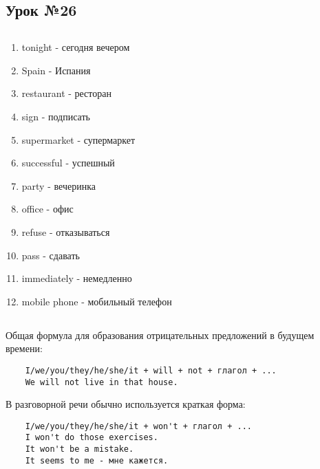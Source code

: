 \subsection{Урок №26}

\subsection*{}
\begin{multicols}{2}
    \begin{enumerate}\setlength{\itemsep}{0pt}
        \item tonight - сегодня вечером
        \item Spain - Испания
        \item restaurant - ресторан
        \item sign - подписать
        \item supermarket - супермаркет
        \item successful - успешный
        \item party - вечеринка
        \item office - офис
        \item refuse - отказываться
        \item pass - сдавать
        \item immediately - немедленно
        \item mobile phone - мобильный телефон
    \end{enumerate}
\end{multicols}

\subsection*{}
Общая формула для образования отрицательных предложений в будущем времени:
\begin{verbatim}
    I/we/you/they/he/she/it + will + not + глагол + ...
    We will not live in that house.
\end{verbatim}

В разговорной речи обычно используется краткая форма:
\begin{verbatim}
    I/we/you/they/he/she/it + won't + глагол + ...
    I won't do those exercises.
    It won't be a mistake.
    It seems to me - мне кажется.
\end{verbatim}